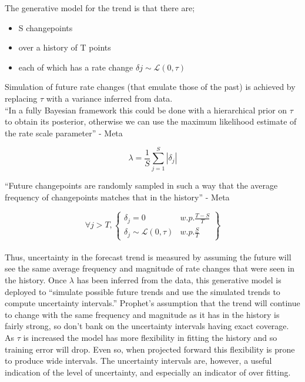 The generative model for the trend is that there are; \\ 
\begin{itemize}
\item	S changepoints
\item	over a history of T points
\item	each of which has a rate change $\delta{j} \sim \mathcal{L}(0,\tau)$
\end{itemize}

Simulation of future rate changes (that emulate those of the past) is achieved by replacing $\tau$ with a variance inferred from data. \\

“In a fully Bayesian framework this could be done with a hierarchical prior on $\tau$ to obtain its posterior, otherwise we can use the maximum likelihood estimate of the rate scale parameter” - Meta

\begin{equation}
    \lambda = \frac{1}{S} \sum_{j=1}^{S} | \delta_{j} |
\end{equation}

“Future changepoints are randomly sampled in such a way that the average frequency of changepoints matches that in the history”
- Meta

\begin{equation}
    \forall{j} > T ,
    \left\{
        \begin{array}{lr}
            \delta_{j} = 0 & w.p. \frac{T-S}{T} \\
            \delta_{j} \sim \mathcal{L}(0,\tau) & w.p. \frac{S}{T}        
        \end{array}
    \right\} 
\end{equation} \\

Thus, uncertainty in the forecast trend is measured by assuming the future will see the same average frequency and magnitude of rate changes that were seen in the history. Once $\lambda $ has been inferred from the data, this generative model is deployed to “simulate possible future trends and use the simulated trends to compute uncertainty intervals.” Prophet’s assumption that the trend will continue to change with the same frequency and magnitude as it has in the history is fairly strong, so don’t bank on the uncertainty intervals having exact coverage.
As $\tau $ is increased the model has more flexibility in fitting the history and so training error will drop. Even so, when projected forward this flexibility is prone to produce wide intervals. The uncertainty intervals are, however, a useful indication of the level of uncertainty, and especially an indicator of over fitting.

